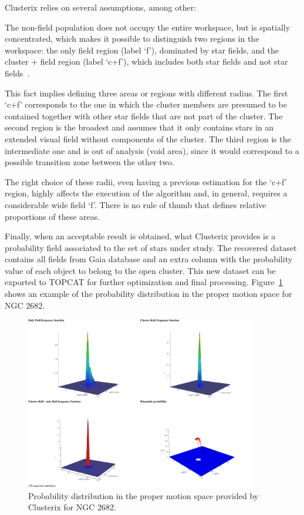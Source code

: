 \documentclass[11pt, a4paper, english]{book}
\begin{document}
Clusterix relies on several assumptions, among other:

\begin{displayquote}
The non-field population does not occupy the entire workspace, but is spatially concentrated,
which makes it possible to distinguish two regions in the workspace:
the only field region (label `f'), dominated by star fields,
and the cluster + field region (label `c+f'), which includes both star fields and not star
fields~\cite{balaguer2020clusterix}.
\end{displayquote}

This fact implies defining three areas or regions with different radius.
The first `c+f' corresponds to the one in which the cluster members are
presumed to be contained together with other star fields that are not part of the cluster.
The second region is the broadest and assumes that it only contains stars
in an extended visual field without components of the cluster.
The third region is the intermediate one and is out of analysis (void area),
since it would correspond to a possible transition zone between the other two.

The right choice of these radii, even having a previous estimation for the `c+f' region,
highly affects the execution of the algorithm and, in general, requires a considerable wide field `f'.
There is no rule of thumb that defines relative proportions of these areas.

Finally, when an acceptable result is obtained,
what Clusterix provides is a probability field associated to the set of stars under study.
The recovered dataset contains all fields from Gaia database
and an extra column with the probability value of each object to belong to the open cluster.
This new dataset can be exported to TOPCAT for further optimization and final processing.
Figure~\ref{fig:clusterix_probability} shows an example of the probability distribution
in the proper motion space for NGC 2682.

\begin{figure}[htbp]
  \centering
  \includegraphics[width=0.9\textwidth]{../figures/clusterix/statistics.pdf}
  \caption{Probability distribution in the proper motion space provided by Clusterix for NGC 2682.}
  \label{fig:clusterix_probability}
\end{figure}
\end{document}
